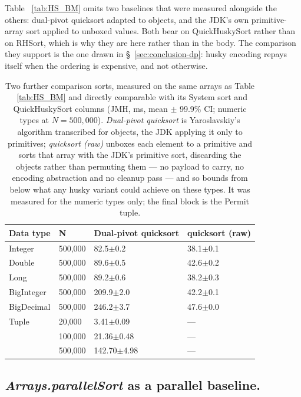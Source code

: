 \documentclass[twoside,leqno,twocolumn]{article}
\begin{document}
Table ~\ref{tab:HS_BM} omits two baselines that were measured alongside the others: dual-pivot
quicksort adapted to objects, and the JDK's own primitive-array sort applied to unboxed values.
Both bear on QuickHuskySort rather than on RHSort, which is why they are here rather than in the
body.
The comparison they support is the one drawn in \S~\ref{sec:conclusion-dp}: husky encoding repays
itself when the ordering is expensive, and not otherwise.

\begin{table}
  \caption{Two further comparison sorts, measured on the same arrays as Table ~\ref{tab:HS_BM} and
    directly comparable with its System sort and QuickHuskySort columns (JMH, ms, mean $\pm$ 99.9\% CI;
    numeric types at $N=500{,}000$). \emph{Dual-pivot quicksort} is Yaroslavskiy's algorithm
    transcribed for objects, the JDK applying it only to primitives; \emph{quicksort (raw)} unboxes each
    element to a primitive and sorts that array with the JDK's primitive sort, discarding the objects
    rather than permuting them --- no payload to carry, no encoding abstraction and no cleanup pass ---
    and so bounds from below what any husky variant could achieve on these types. It was measured for
    the numeric types only; the final block is the Permit tuple.}
  \label{tab:ComparisonBaselines}
  \centering
  \begin{tabular}{llll}
    \toprule
    Data type & N & Dual-pivot quicksort & quicksort (raw) \\
    \midrule
    Integer & 500,000 & 82.5$\pm$0.2 & 38.1$\pm$0.1 \\
    Double & 500,000 & 89.6$\pm$0.5 & 42.6$\pm$0.2 \\
    Long & 500,000 & 89.2$\pm$0.6 & 38.2$\pm$0.3 \\
    BigInteger & 500,000 & 209.9$\pm$2.0 & 42.2$\pm$0.1 \\
    BigDecimal & 500,000 & 246.2$\pm$3.7 & 47.6$\pm$0.0 \\
    \midrule
    Tuple & 20,000 & 3.41$\pm$0.09 & --- \\
    & 100,000 & 21.36$\pm$0.48 & --- \\
    & 500,000 & 142.70$\pm$4.98 & --- \\
    \bottomrule
  \end{tabular}
\end{table}

\subsection{\texorpdfstring{\textit{Arrays.parallelSort}}{Arrays.parallelSort} as a parallel baseline.}
\label{sec:parallel-baseline}
\end{document}
